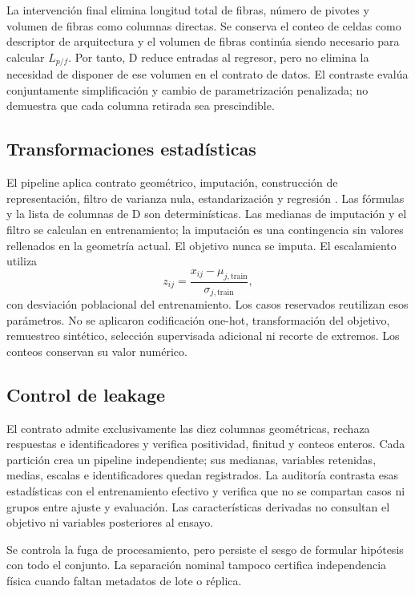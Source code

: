La intervención final elimina longitud total de fibras, número de pivotes y volumen de fibras como columnas directas. Se conserva el conteo de celdas como descriptor de arquitectura y el volumen de fibras continúa siendo necesario para calcular $L_{p/f}$. Por tanto, D reduce entradas al regresor, pero no elimina la necesidad de disponer de ese volumen en el contrato de datos. El contraste evalúa conjuntamente simplificación y cambio de parametrización penalizada; no demuestra que cada columna retirada sea prescindible.

\subsection{Transformaciones estadísticas}
El pipeline aplica contrato geométrico, imputación, construcción de representación, filtro de varianza nula, estandarización y regresión \cite{pedregosa2011}. Las fórmulas y la lista de columnas de D son determinísticas. Las medianas de imputación y el filtro se calculan en entrenamiento; la imputación es una contingencia sin valores rellenados en la geometría actual. El objetivo nunca se imputa. El escalamiento utiliza
\begin{equation}
z_{ij}=\frac{x_{ij}-\mu_{j,\mathrm{train}}}{\sigma_{j,\mathrm{train}}},
\label{eq:escalamiento}
\end{equation}
con desviación poblacional del entrenamiento. Los casos reservados reutilizan esos parámetros. No se aplicaron codificación one-hot, transformación del objetivo, remuestreo sintético, selección supervisada adicional ni recorte de extremos. Los conteos conservan su valor numérico.

\subsection{Control de leakage}
El contrato admite exclusivamente las diez columnas geométricas, rechaza respuestas e identificadores y verifica positividad, finitud y conteos enteros. Cada partición crea un pipeline independiente; sus medianas, variables retenidas, medias, escalas e identificadores quedan registrados. La auditoría contrasta esas estadísticas con el entrenamiento efectivo y verifica que no se compartan casos ni grupos entre ajuste y evaluación. Las características derivadas no consultan el objetivo ni variables posteriores al ensayo.

Se controla la fuga de procesamiento, pero persiste el sesgo de formular hipótesis con todo el conjunto. La separación nominal tampoco certifica independencia física cuando faltan metadatos de lote o réplica.

